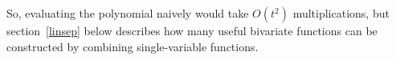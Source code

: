 \documentclass{article}
\begin{document}
        So, evaluating the polynomial naively would take $O(t^2)$ multiplications,
        but section~\ref{linsep} below describes how many useful bivariate functions can be constructed by combining single-variable functions.



\end{document}

